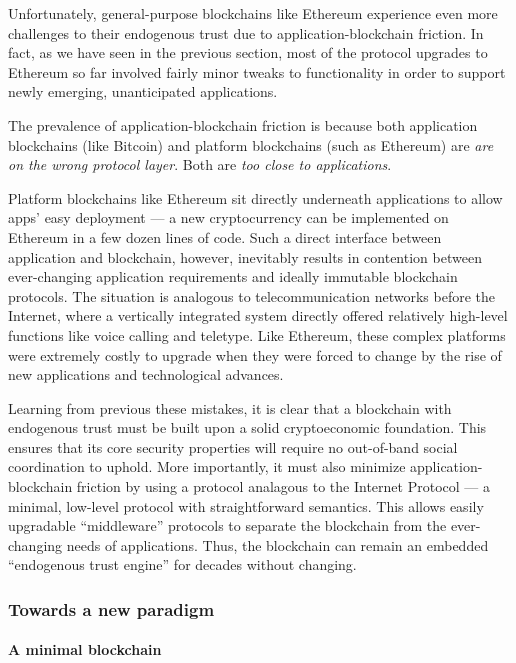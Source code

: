 \documentclass[]{article}
\let\oldparagraph\paragraph
\renewcommand{\paragraph}[1]{\oldparagraph{#1}\mbox{}}
\begin{document}
Unfortunately, general-purpose blockchains like Ethereum experience even
more challenges to their endogenous trust due to application-blockchain
friction. In fact, as we have seen in the previous section, most of the
protocol upgrades to Ethereum so far involved fairly minor tweaks to
functionality in order to support newly emerging, unanticipated
applications.

The prevalence of application-blockchain friction is because both
application blockchains (like Bitcoin) and platform blockchains (such as
Ethereum) are \emph{are on the wrong protocol layer}. Both are \emph{too
close to applications}.

Platform blockchains like Ethereum sit directly underneath applications
to allow apps' easy deployment --- a new cryptocurrency can be
implemented on Ethereum in a few dozen lines of code. Such a direct
interface between application and blockchain, however, inevitably
results in contention between ever-changing application requirements and
ideally immutable blockchain protocols. The situation is analogous to
telecommunication networks before the Internet, where a vertically
integrated system directly offered relatively high-level functions like
voice calling and teletype. Like Ethereum, these complex platforms were
extremely costly to upgrade when they were forced to change by the rise
of new applications and technological advances.

Learning from previous these mistakes, it is clear that a blockchain
with endogenous trust must be built upon a solid cryptoeconomic
foundation. This ensures that its core security properties will require
no out-of-band social coordination to uphold. More importantly, it must
also minimize application-blockchain friction by using a protocol
analagous to the Internet Protocol --- a minimal, low-level protocol
with straightforward semantics. This allows easily upgradable
``middleware'' protocols to separate the blockchain from the
ever-changing needs of applications. Thus, the blockchain can remain an
embedded ``endogenous trust engine'' for decades without changing.

\hypertarget{towards-a-new-paradigm}{%
\subsubsection{Towards a new paradigm}\label{towards-a-new-paradigm}}

\hypertarget{a-minimal-blockchain}{%
\paragraph{A minimal blockchain}\label{a-minimal-blockchain}}
\end{document}
